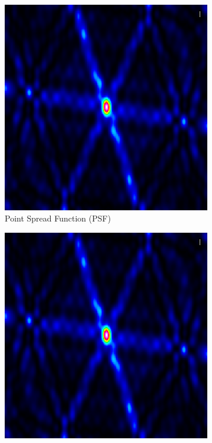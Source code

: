 \begin{figure}[h!]
	\centering
	\begin{subfigure}[b]{0.3\linewidth}
		\includegraphics[width=\linewidth]{./chapters/01.intro/img/PSF.png}
		\caption{Point Spread Function (PSF)}
	\end{subfigure}
	\begin{subfigure}[b]{0.3\linewidth}
		\includegraphics[width=\linewidth]{./chapters/01.intro/img/PSF.png}

\end{subfigure}
\end{figure}
